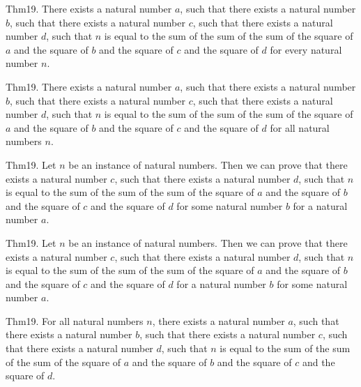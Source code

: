 \documentclass{article}
\begin{document}
Thm19. There exists a natural number $a$, such that there exists a natural number $b$, such that there exists a natural number $c$, such that there exists a natural number $d$, such that $n$ is equal to the sum of the sum of the sum of the square of $a$ and the square of $b$ and the square of $c$ and the square of $d$ for every natural number $n$.

Thm19. There exists a natural number $a$, such that there exists a natural number $b$, such that there exists a natural number $c$, such that there exists a natural number $d$, such that $n$ is equal to the sum of the sum of the sum of the square of $a$ and the square of $b$ and the square of $c$ and the square of $d$ for all natural numbers $n$.

Thm19. Let $n$ be an instance of natural numbers. Then we can prove that there exists a natural number $c$, such that there exists a natural number $d$, such that $n$ is equal to the sum of the sum of the sum of the square of $a$ and the square of $b$ and the square of $c$ and the square of $d$ for some natural number $b$ for a natural number $a$.

Thm19. Let $n$ be an instance of natural numbers. Then we can prove that there exists a natural number $c$, such that there exists a natural number $d$, such that $n$ is equal to the sum of the sum of the sum of the square of $a$ and the square of $b$ and the square of $c$ and the square of $d$ for a natural number $b$ for some natural number $a$.

Thm19. For all natural numbers $n$, there exists a natural number $a$, such that there exists a natural number $b$, such that there exists a natural number $c$, such that there exists a natural number $d$, such that $n$ is equal to the sum of the sum of the sum of the square of $a$ and the square of $b$ and the square of $c$ and the square of $d$.
\end{document}
